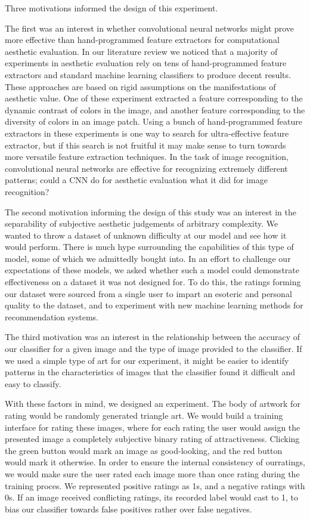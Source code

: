 \documentclass[midd]{thesis}
\begin{document}
Three motivations informed the design of this experiment.

The first was an interest in whether convolutional neural networks might prove more effective than hand-programmed feature extractors for computational aesthetic evaluation. In our literature review we noticed that a majority of experiments in aesthetic evaluation rely on tens of hand-programmed feature extractors and standard machine learning classifiers to produce decent results. These approaches are based on rigid assumptions on the manifestations of aesthetic value. One of these experiment extracted a feature corresponding to the dynamic contrast of colors in the image, and another feature corresponding to the diversity of colors in an image patch. Using a bunch of hand-programmed feature extractors in these experiments is one way to search for ultra-effective feature extractor, but if this search is not fruitful it may make sense to turn towards more versatile feature extraction techniques. In the task of image recognition, convolutional neural networks are effective for recognizing extremely different patterns; could a CNN do for aesthetic evaluation what it did for image recognition?

The second motivation informing the design of this study was an interest in the separability of subjective aesthetic judgements of arbitrary complexity. We wanted to throw a dataset of unknown difficulty at our model and see how it would perform. There is much hype surrounding the capabilities of this type of model, some of which we admittedly bought into. In an effort to challenge our expectations of these models, we asked whether such a model could demonstrate effectiveness on a dataset it was not designed for. To do this, the ratings forming our dataset were sourced from a single user to impart an esoteric and personal quality to the dataset, and to experiment with new machine learning methods for recommendation systems.

The third motivation was an interest in the relationship between the accuracy of our classifier for a given image and the type of image provided to the classifier. If we used a simple type of art for our experiment, it might be easier to identify patterns in the characteristics of images that the classifier found it difficult and easy to classify.

With these factors in mind, we designed an experiment. The body of artwork for rating would be randomly generated triangle art. We would build a training interface for rating these images, where for each rating the user would assign the presented image a completely subjective binary rating of attractiveness. Clicking the green button would mark an image as good-looking, and the red button would mark it otherwise. In order to ensure the internal consistency of ourratings, we would make sure the user rated each image more than once rating during the training proces. We represented positive ratings as 1s, and a negative ratings with 0s. If an image received conflicting ratings, its recorded label would cast to 1, to bias our classifier towards false positives rather over false negatives.
\end{document}
